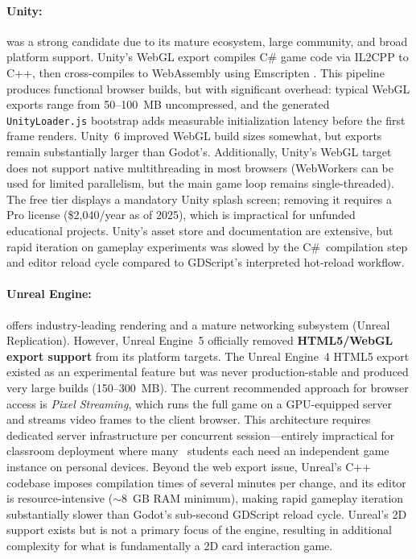 \paragraph*{Unity:}
was a strong candidate due to its mature ecosystem, large community, and broad platform support. Unity's WebGL export compiles C\# game code via IL2CPP to C++, then cross-compiles to WebAssembly using Emscripten \citep{emscripten_docs}. This pipeline produces functional browser builds, but with significant overhead: typical WebGL exports range from 50--100~MB uncompressed, and the generated \texttt{UnityLoader.js} bootstrap adds measurable initialization latency before the first frame renders. Unity~6 improved WebGL build sizes somewhat, but exports remain substantially larger than Godot's. Additionally, Unity's WebGL target does not support native multithreading in most browsers (WebWorkers can be used for limited parallelism, but the main game loop remains single-threaded). The free tier displays a mandatory Unity splash screen; removing it requires a Pro license (\$2,040/year as of 2025), which is impractical for unfunded educational projects. Unity's asset store and documentation are extensive, but rapid iteration on gameplay experiments was slowed by the C\#~compilation step and editor reload cycle compared to GDScript's interpreted hot-reload workflow.

\paragraph*{Unreal Engine:}
offers industry-leading rendering and a mature networking subsystem (Unreal Replication). However, Unreal Engine~5 officially removed \textbf{HTML5\-/\-WebGL \-export support} from its platform targets. The Unreal Engine~4 HTML5 export existed as an experimental feature but was never production-stable and produced very large builds (150--300~MB). The current recommended approach for browser access is \textit{Pixel\- Streaming}, which runs the full game on a GPU-equipped server and streams video frames to the client browser. This architecture requires dedicated server infrastructure per concurrent session---entirely impractical for classroom deployment where many ~students each need an independent game instance on personal devices. Beyond the web export issue, Unreal's C++ codebase imposes compilation times of several minutes per change, and its editor is resource-intensive ($\sim$8~GB RAM minimum), making rapid gameplay iteration substantially slower than Godot's sub-second GDScript reload cycle. Unreal's 2D support exists but is not a primary focus of the engine, resulting in additional complexity for what is fundamentally a 2D card interaction game.

